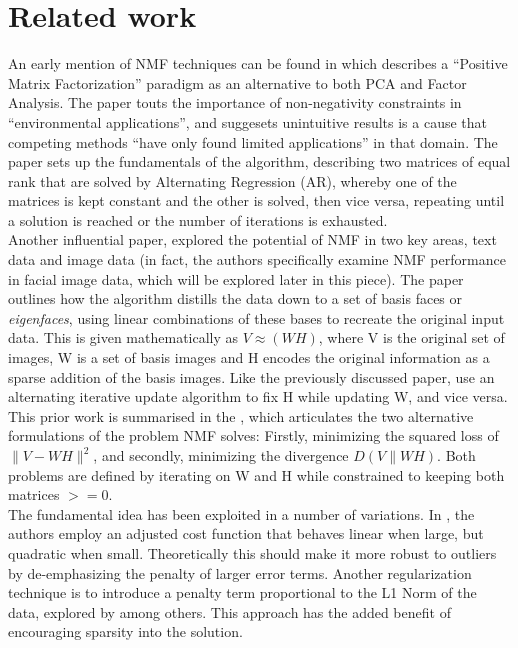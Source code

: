 \documentclass{article} %
\begin{document}
\section{Related work}
An early mention of NMF techniques can be found in \cite{paatero1994} which describes a ``Positive Matrix Factorization'' paradigm as an alternative to both PCA and Factor Analysis. The paper touts the importance of non-negativity constraints in ``environmental applications'', and suggesets unintuitive results is a cause that competing methods ``have only found limited applications'' in that domain. The paper sets up the fundamentals of the algorithm, describing two matrices of equal rank that are solved by Alternating Regression (AR), whereby one of the matrices is kept constant and the other is solved, then vice versa, repeating until a solution is reached or the number of iterations is exhausted.\\

Another influential paper, \cite{lee99} explored the potential of NMF in two key areas, text data and image data (in fact, the authors specifically examine NMF performance in facial image data, which will be explored later in this piece). The paper outlines how the algorithm distills the data down to a set of basis faces or \textit{eigenfaces}, using linear combinations of these bases to recreate the original input data. This is given mathematically as \(V \approx (WH)\), where V is the original set of images, W is a set of basis images and H encodes the original information as a sparse addition of the basis images. Like the previously discussed paper, \cite{lee99} use an alternating iterative update algorithm to fix H while updating W, and vice versa.\\

This prior work is summarised in the \cite{NIPS2000_1861}, which articulates the two alternative formulations of the problem NMF solves: Firstly, minimizing the squared loss of $\|V - WH\|^2$, and secondly, minimizing the divergence $D(V\|WH)$. Both problems are defined  by iterating on W and H while constrained to keeping both matrices $>=0$. \\

The fundamental idea has been exploited in a number of variations. In \cite{Hamza2006}, the authors employ an adjusted cost function that behaves linear when large, but quadratic when small. Theoretically this should make it more robust to outliers by de-emphasizing the penalty of larger error terms. Another regularization technique is to introduce a penalty term proportional to the L1 Norm of the data, explored by \cite{Ke_2005} among others. This approach has the added benefit of encouraging sparsity into the solution.\\
\end{document}
